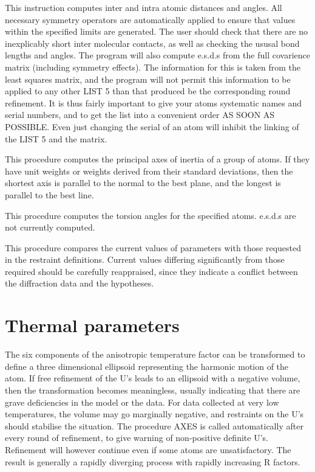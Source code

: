 \documentclass[10pt,a4paper]{report}
\begin{document}
\bigskip{}




This instruction computes inter and intra atomic distances and angles. All
 necessary symmetry operators are automatically applied to ensure that values
 within the specified limits are generated. The user should check that there
 are no inexplicably short inter molecular contacts, as well as checking the
 ususal bond lengths and angles. The program will also compute e.s.d.s
 from the full covarience matrix (including symmetry effects). The information
 for this is taken from the least squares matrix, and the program will not
 permit this information to be applied to any other LIST 5 than that produced
 be the corresponding round refinement. It is thus fairly important to give
 your atoms systematic names and serial numbers, and to get the list into
 a convenient order AS SOON AS POSSIBLE. Even just changing the serial of
 an atom will inhibit the linking of the LIST 5 and the matrix.


\bigskip{}




This procedure computes the principal axes of inertia of a group of atoms.
 If they have unit weights or weights derived from their standard deviations,
 then the shortest axis is parallel to the normal to the best plane, and
 the longest is parallel to the best line. 


\bigskip{}




This procedure computes the torsion angles for the specified atoms. e.s.d.s
 are not currently computed.


\bigskip{}




This procedure compares the current values of parameters with those 
 requested in the restraint definitions. Current values differing
 significantly  from those required should be carefully reappraised, since
 they indicate a conflict between the diffraction data and the hypotheses.
\section{Thermal parameters}


\bigskip{}




The six components of the anisotropic temperature factor can be transformed
 to define a three dimensional ellipsoid representing the harmonic motion of
 the atom. If free refinement of the U's leads to an ellipsoid with a negative
 volume, then the transformation becomes meaningless, usually indicating that
 there are grave deficiencies in the model or the data. For data collected
 at very low temperatures, the volume may go marginally negative, and
 restraints on the U's should stabilise the situation. The procedure AXES
 is called automatically after every round of refinement, to give warning
 of non-positive definite U's. Refinement will however continue even if
 some atoms are unsatisfactory. The result is generally a rapidly diverging
 process with rapidly increasing R factors.
\end{document}
